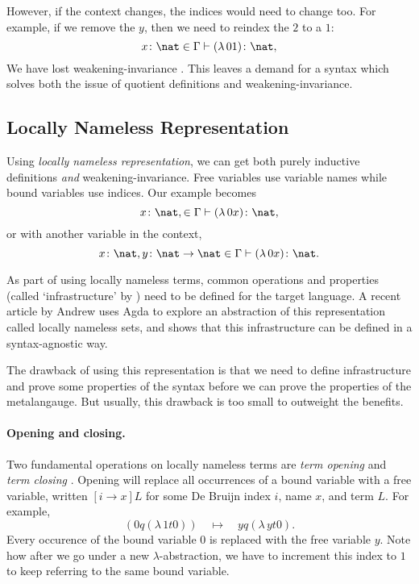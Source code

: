 However, if the context changes, the indices would need to change too. For example, if we remove the
$y$, then we need to reindex the $2$ to a $1$:
\begin{equation*}
  x \colon \nat \in \Gamma \vdash (\lambda \, 0 1) \colon \nat,
\end{equation*}
We have lost weakening-invariance \citep{aydemir_engineering_2008}. This leaves a demand for a
syntax which solves both the issue of quotient definitions and weakening-invariance.

\subsection{Locally Nameless Representation}
\label{section:background_locally_nameless}
Using \textit{locally nameless representation}, we can get both purely inductive definitions
\textit{and} weakening-invariance. Free variables use variable names while bound variables use
indices. Our example becomes
\begin{equation*}
  x \colon \nat, \in \Gamma \vdash (\lambda \, 0 x) \colon \nat,
\end{equation*}
or with another variable in the context,
\begin{equation*}
  x \colon \nat, y \colon \nat \to \nat \in \Gamma \vdash (\lambda \, 0 x) \colon \nat.
\end{equation*}

As part of using locally nameless terms, common operations and properties (called `infrastructure'
by \citet{aydemir_engineering_2008}) need to be defined for the target language. A recent article by
Andrew \citet{pitts_locally_2023} uses Agda to explore an abstraction of this representation called
locally nameless sets, and shows that this infrastructure can be defined in a syntax-agnostic way.

The drawback of using this representation is that we need to define infrastructure and prove some
properties of the syntax before we can prove the properties of the metalangauge. But usually, this
drawback is too small to outweight the benefits.

\paragraph*{Opening and closing.} Two fundamental operations on locally nameless terms are
\textit{term opening} and \textit{term closing} \citep{pitts_locally_2023}. Opening will replace all
occurrences of a bound variable with a free variable, written $[i \to x] L$ for some De Bruijn
index $i$, name $x$, and term $L$. For example,
\begin{equation*}
  [0 \to y] (0 q (\lambda \, 1 t 0)) \quad \mapsto \quad y q (\lambda \, y t 0).
\end{equation*}
Every occurence of the bound variable $0$ is replaced with the free variable $y$. Note how after we
go under a new $\lambda$-abstraction, we have to increment this index to $1$ to keep referring to
the same bound variable.

